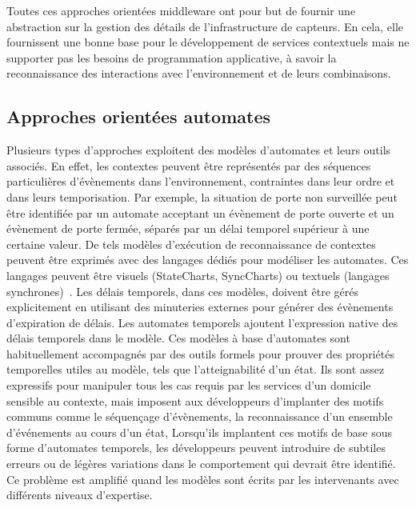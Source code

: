 Toutes ces approches orientées middleware ont pour but de fournir une abstraction sur la gestion des détails de 
l'infrastructure de capteurs. En cela, elle fournissent une bonne base pour le développement de services contextuels
mais ne supporter pas les besoins de programmation applicative,
à savoir la reconnaissance des interactions avec l'environnement et de leurs combinaisons. 

\subsection{Approches orientées automates}
Plusieurs types d'approches exploitent des modèles d'automates et leurs outils associés. 
En effet, les contextes peuvent être représentés par des séquences 
particulières d'évènements dans l'environnement, contraintes dans leur ordre et 
dans leurs temporisation. Par exemple, la situation de porte non surveillée 
peut être identifiée par un automate acceptant un évènement de porte ouverte et 
un évènement de porte fermée, séparés par un délai temporel supérieur à une 
certaine valeur. De tels modèles d'exécution de reconnaissance de contextes 
peuvent être exprimés avec des langages dédiés pour modéliser les automates.
Ces langages 
peuvent être visuels (StateCharts, SyncCharts) ou textuels (langages 
synchrones)~\parencite{gamatie2010synchronous}. Les délais temporels, dans ces modèles, 
doivent être gérés explicitement en utilisant des minuteries externes pour 
générer des évènements d'expiration de délais. Les automates temporels \parencite{bengtsson2004timed} 
ajoutent l'expression native des délais temporels dans le modèle. Ces modèles 
à base d'automates sont habituellement accompagnés par des outils formels pour 
prouver des propriétés temporelles utiles au modèle, tels que l'atteignabilité 
d'un état. Ils sont assez expressifs pour manipuler tous les cas requis par les 
services d'un domicile sensible au contexte, mais imposent aux
développeurs d'implanter des motifs communs comme le séquençage d'évènements, 
la reconnaissance d'un ensemble d'événements au cours d'un état, \etc Lorsqu'ils
implantent ces motifs de base sous forme d'automates temporels, les développeurs
peuvent introduire de subtiles erreurs ou de légères variations dans le 
comportement qui devrait être identifié. Ce problème est amplifié quand les 
modèles sont écrits par les intervenants avec différents niveaux d'expertise.


